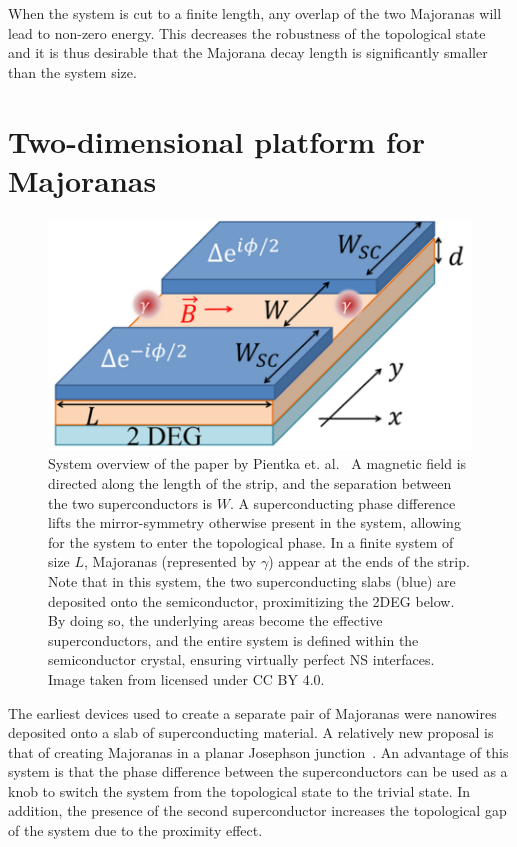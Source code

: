         When the system is cut to a finite length, any overlap of the two Majoranas will lead to non-zero energy.
        This decreases the robustness of the topological state and it is thus desirable that the Majorana decay length is significantly smaller than the system size.

\section{ Two-dimensional platform for Majoranas}

    \begin{figure}[!htb]
    \centering
    \includegraphics[width=0.5\columnwidth]{figures/pientka_system}
    \caption{System overview of the paper by Pientka et. al.~\cite{pientka_topological_2017}
    A magnetic field is directed along the length of the strip, and the separation between the two superconductors is $W$.
    A superconducting phase difference lifts the mirror-symmetry otherwise present in the system, allowing for the system to enter the topological phase.
    In a finite system of size $L$, Majoranas (represented by $\gamma$) appear at the ends of the strip.
    Note that in this system, the two superconducting slabs (blue) are deposited onto the semiconductor, proximitizing the 2DEG below.
    By doing so, the underlying areas become the effective superconductors, and the entire system is defined within the semiconductor crystal, ensuring virtually perfect NS interfaces.\\
    Image taken from \cite{pientka_topological_2017} licensed under CC BY 4.0.
    }
    \label{fig:pientka_system}
    \end{figure}

    The earliest devices used to create a separate pair of Majoranas were nanowires deposited onto a slab of superconducting material.
    A relatively new proposal is that of creating Majoranas in a planar Josephson junction~\cite{pientka_topological_2017}.
    An advantage of this system is that the phase difference between the superconductors can be used as a knob to switch the system from the topological state to the trivial state. 
    In addition, the presence of the second superconductor increases the topological gap of the system due to the proximity effect.

